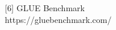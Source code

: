 \documentclass[preview]{standalone}
\begin{document}
\begin{center}
[6] GLUE Benchmark\\https://gluebenchmark.com/
\end{center}
\end{document}
